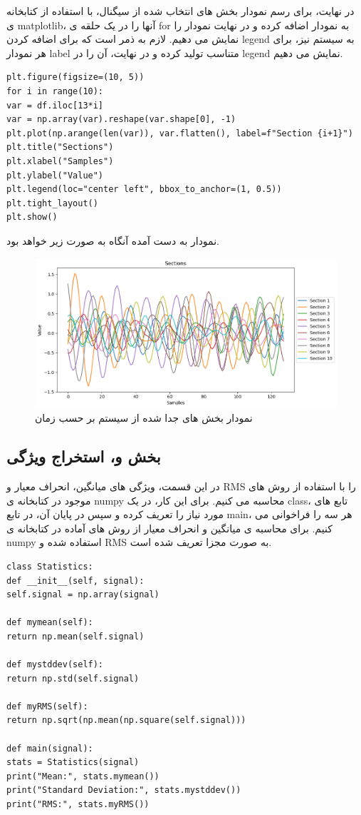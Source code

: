 در نهایت، برای رسم نمودار بخش های انتخاب شده از سیگنال، با استفاده از کتابخانه ی matplotlib، آنها را در یک حلقه ی for به نمودار اضافه کرده و در نهایت نمودار را نمایش می دهیم. لازم به ذمر است که برای اضافه کردن legend به سیستم نیز، برای هر نمودار label متناسب تولید کرده و در نهایت، آن را در legend نمایش می دهیم.
\begin{verbatim}
plt.figure(figsize=(10, 5))
for i in range(10):
var = df.iloc[13*i]
var = np.array(var).reshape(var.shape[0], -1)  
plt.plot(np.arange(len(var)), var.flatten(), label=f"Section {i+1}")  
plt.title("Sections")
plt.xlabel("Samples")
plt.ylabel("Value")
plt.legend(loc="center left", bbox_to_anchor=(1, 0.5)) 
plt.tight_layout()  
plt.show()
\end{verbatim}
نمودار به دست آمده آنگاه به صورت زیر خواهد بود.
\begin{figure}[H]
	\centering
	\includegraphics[width=1\linewidth]{../img/5}
	\caption{نمودار بخش های جدا شده از سیستم بر حسب زمان}
	\label{fig:5_}
\end{figure}

\subsection{بخش و، استخراج ویژگی}
در این قسمت، ویژگی های میانگین، انحراف معیار و RMS را با استفاده از روش های موجود در کتابخانه ی numpy محاسبه می کنیم. برای این کار، در یک class، تابع های مورد نیاز را تعریف کرده و سپس در پایان آن، در تابع main، هر سه را فراخوانی می کنیم. برای محاسبه ی میانگین و انحراف معیار از روش های آماده در کتابخانه ی numpy استفاده شده و RMS به صورت مجزا تعریف شده است.

\begin{verbatim}
class Statistics:
def __init__(self, signal):
self.signal = np.array(signal)

def mymean(self):
return np.mean(self.signal)

def mystddev(self):
return np.std(self.signal)

def myRMS(self):
return np.sqrt(np.mean(np.square(self.signal)))

def main(signal):
stats = Statistics(signal)
print("Mean:", stats.mymean())
print("Standard Deviation:", stats.mystddev())
print("RMS:", stats.myRMS())
\end{verbatim}
	
